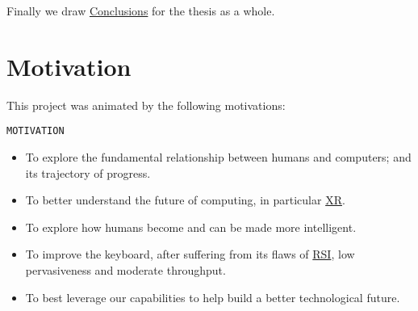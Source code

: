 \documentclass[logo,bsc,singlespacing,parskip]{infthesis}
\begin{document}
Finally we draw \hyperref[sec:orgafa5763]{Conclusions} for the thesis as a whole.

\chapter*{Motivation}
\label{sec:org4f0a011}

This project was animated by the following motivations:

\begin{mdframed}
\begin{description}
\item[{\texttt{MOTIVATION}}] 
\end{description}


\begin{itemize}
\item To explore the fundamental relationship between humans and computers; and its trajectory of progress.

\item To better understand the future of computing, in particular \hyperref[orgf7f8e78]{XR}.

\item To explore how humans become and can be made more intelligent.

\item To improve the keyboard, after suffering from its flaws of \hyperref[orgc186d45]{RSI}, low pervasiveness and moderate throughput.

\item To best leverage our capabilities to help build a better technological future.
\end{itemize}
\end{mdframed}
\end{document}
